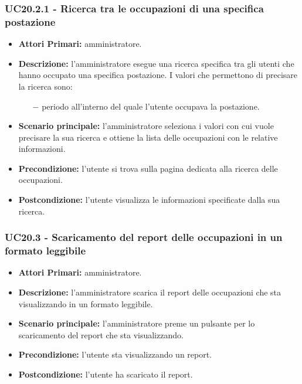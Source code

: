 \subsubsection{ UC20.2.1 - Ricerca tra le occupazioni di una specifica postazione}
\begin{itemize}
	\item\textbf{Attori Primari:} 
	amministratore.
	\item\textbf{Descrizione:} 
	l'amministratore esegue una ricerca specifica tra gli utenti che hanno occupato una specifica postazione.
	I valori che permettono di precisare la ricerca sono:
	\begin{itemize}
		\item[$-$] periodo all'interno del quale l'utente occupava la postazione.
	\end{itemize}
	\item\textbf{Scenario principale:} 
	l'amministratore seleziona i valori con cui vuole precisare la sua ricerca e ottiene la lista delle occupazioni con le relative informazioni.
	\item\textbf{Precondizione:} 
	l'utente si trova sulla pagina dedicata alla ricerca delle occupazioni.
	\item\textbf{Postcondizione:}
	l'utente visualizza le informazioni specificate dalla sua ricerca.
\end{itemize}

\subsubsection{ UC20.3 - Scaricamento del report delle occupazioni in un formato leggibile}
\begin{itemize}
	\item\textbf{Attori Primari:} 
	amministratore.
	\item\textbf{Descrizione:} 
	l'amministratore scarica il report delle occupazioni che sta visualizzando in un formato leggibile.
	\item\textbf{Scenario principale:} 
	l'amministratore preme un pulsante per lo scaricamento del report che sta visualizzando.
	\item\textbf{Precondizione:} 
	l'utente sta visualizzando un report.
	\item\textbf{Postcondizione:}
	l'utente ha scaricato il report.
\end{itemize}

